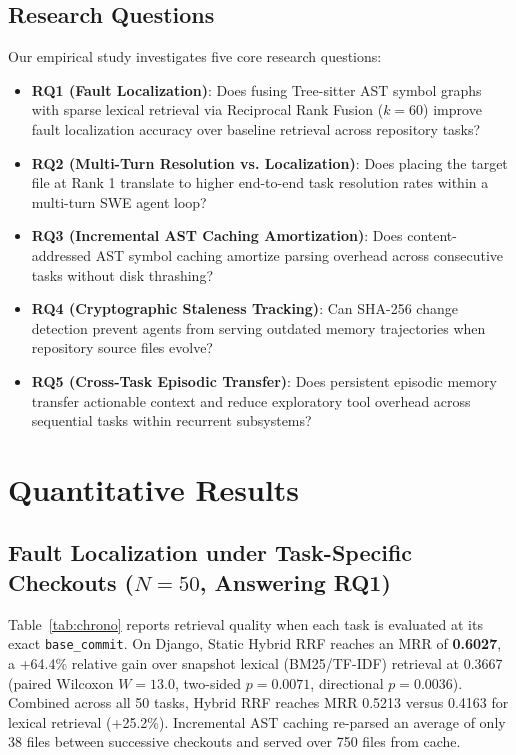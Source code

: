 \documentclass[conference]{IEEEtran}
\begin{document}
\subsection{Research Questions}
Our empirical study investigates five core research questions:
\begin{itemize}
    \item \textbf{RQ1 (Fault Localization)}: Does fusing Tree-sitter AST symbol graphs with sparse lexical retrieval via Reciprocal Rank Fusion ($k=60$) improve fault localization accuracy over baseline retrieval across repository tasks?
    \item \textbf{RQ2 (Multi-Turn Resolution vs. Localization)}: Does placing the target file at Rank 1 translate to higher end-to-end task resolution rates within a multi-turn SWE agent loop?
    \item \textbf{RQ3 (Incremental AST Caching Amortization)}: Does content-addressed AST symbol caching amortize parsing overhead across consecutive tasks without disk thrashing?
    \item \textbf{RQ4 (Cryptographic Staleness Tracking)}: Can SHA-256 change detection prevent agents from serving outdated memory trajectories when repository source files evolve?
    \item \textbf{RQ5 (Cross-Task Episodic Transfer)}: Does persistent episodic memory transfer actionable context and reduce exploratory tool overhead across sequential tasks within recurrent subsystems?
\end{itemize}

\section{Quantitative Results}
\label{sec:retrieval}

\subsection{Fault Localization under Task-Specific Checkouts ($N=50$, Answering RQ1)}
Table~\ref{tab:chrono} reports retrieval quality when each task is evaluated at its exact \texttt{base\_commit}. On Django, Static Hybrid RRF reaches an MRR of \textbf{0.6027}, a +64.4\% relative gain over snapshot lexical (BM25/TF-IDF) retrieval at 0.3667 (paired Wilcoxon $W=13.0$, two-sided $p=0.0071$, directional $p=0.0036$). Combined across all 50 tasks, Hybrid RRF reaches MRR 0.5213 versus 0.4163 for lexical retrieval (+25.2\%). Incremental AST caching re-parsed an average of only 38 files between successive checkouts and served over 750 files from cache.
\end{document}
